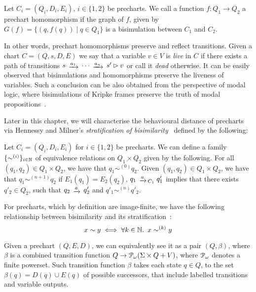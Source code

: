 \begin{definition}
	 Let $C_i = (Q_i,D_i,E_i)$, $i \in \{1,2\}$ be precharts. We call a function $f \colon Q_1 \to Q_2$ a prechart homomorphism if the graph of $f$, given by $G(f) = \{(q,f(q)) \mid q \in Q_1\}$ is a bisimulation between $C_1$ and $C_2$.
\end{definition}
In other words, prechart homomorphisms preserve and reflect transitions. Given a chart $C=(Q,s,D,E)$ we say that a variable $v \in V$ is \emph{live} in $C$ if there exists a path of transitions $s \tr{a_1} \dots \tr{a_n} s' \rhd v$ or call it \emph{dead} otherwise. It can be easily observed that bisimulations and homomorphisms preserve the liveness of variables. Such a conclusion can be also obtained from the perspective of modal logic, where bisimulations of Kripke frames preserve the truth of modal propositions~\cite[Chapter~2]{Blackburn:2001:Modal}.

Later in this chapter, we will characterise the behavioural distance of precharts via Hennessy and Milner's \emph{stratification of bisimilarity}~\cite{hennessy:1985:algebraic} defined by the following:
	\begin{definition}
	Let $C_i = (Q_i, D_i, E_i)$ for $i \in \{1,2\}$ be precharts. We can define a family $\{\sim^{(i)} \}_{i \in \mathbb{N}}$ of equivalence relations on $Q_1 \times Q_2$ given by the following. For all $(q_1,q_2) \in Q_1 \times Q_2$, we have that $q_1 \sim^{(0)} q_2$. Given $(q_1, q_2) \in Q_1 \times Q_2$, we have that $q_1 \sim ^{(n+1)} q_2$ if  $E_1(q_1) = E_2(q_2)$,  $q_1 \tr{a}_{C_1} q'_1$ implies that there exists $q'_2 \in Q_2$, such that $q_2 \tr{a} q'_2$ and $q'_1 \sim^{(n)} q'_2$.
\end{definition}

For precharts, which by definition are image-finite, we have the following relationship between bisimilarity and its stratification~\cite{hennessy:1985:algebraic}:
\begin{equation}\label{eqn:stratification}
	x \sim y \iff \forall k \in \mathbb{N} \ldotp~x\sim^{(k)} y
\end{equation}

Given a prechart $(Q, E, D)$, we can equivalently see it as a pair $(Q, \beta)$, where $\beta$ is a combined transition function $Q \to \mathcal{P}_\omega (\Sigma \times Q + V)$, where $\mathcal{P}_\omega$ denotes a finite powerset. Such transition function $\beta$ takes each state $q \in Q$, to the set $\beta(q) = D(q) \cup E(q)$ of possible successors, that include labelled transitions and variable outputs.

